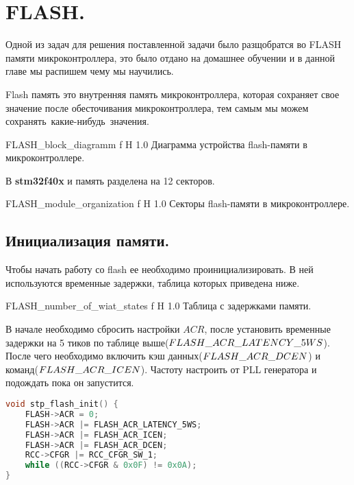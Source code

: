 \documentclass{bmstu}
\begin{document}
	\chapter{FLASH.}
	
	Одной из задач для решения поставленной задачи было разщобратся во FLASH памяти микроконтроллера, это было отдано на домашнее обучении и в данной главе мы распишем чему мы научились.
	
	Flash память это внутренняя память микроконтроллера, которая сохраняет свое значение после обесточивания микроконтроллера, тем самым мы можем сохранять какие-нибудь значения.
	
	{FLASH_block_diagramm} %
	{f} %
	{H} %
	{1.0\textwidth} %
	{Диаграмма устройства flash-памяти в микроконтроллере.}
		
	В \textbf{stm32f40x} и  память разделена на 12 секторов.
	
	{FLASH_module_organization} %
	{f} %
	{H} %
	{1.0\textwidth} %
	{Секторы flash-памяти в микроконтроллере.}

	\section{Инициализация памяти.}
		
	Чтобы начать работу со flash ее необходимо проинициализировать. В ней используются временные задержки, таблица которых приведена ниже.
	
	{FLASH_number_of_wiat_states} %
	{f} %
	{H} %
	{1.0\textwidth} %
	{Таблица с задержками памяти.}
	
	В начале необходимо сбросить настройки $ACR$, после установить временные задержки на 5 тиков по таблице выше($FLASH\text{\textunderscore}ACR\text{\textunderscore}LATENCY\text{\textunderscore}5WS$). После чего необходимо включить кэш данных($FLASH\text{\textunderscore}ACR\text{\textunderscore}DCEN$) и команд($FLASH\text{\textunderscore}ACR\text{\textunderscore}ICEN$). Частоту настроить от PLL генератора и подождать пока он запустится.
	
	\begingroup
	\fontsize{12pt}{12pt}\selectfont
	\begin{lstlisting}[language=C]
void stp_flash_init() {
	FLASH->ACR = 0;
	FLASH->ACR |= FLASH_ACR_LATENCY_5WS;
	FLASH->ACR |= FLASH_ACR_ICEN;
	FLASH->ACR |= FLASH_ACR_DCEN;
	RCC->CFGR |= RCC_CFGR_SW_1;
	while ((RCC->CFGR & 0x0F) != 0x0A);
}
	\end{lstlisting}
	\endgroup
	
\end{document}
